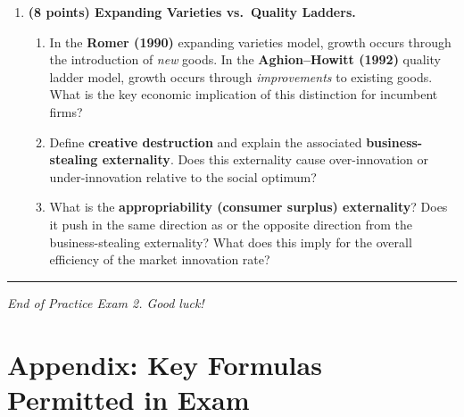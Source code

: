 \documentclass[a4paper,11pt]{article}
\begin{document}
\begin{enumerate}[label=\textbf{\arabic*.}, leftmargin=*, itemsep=14pt]
\begin{enumerate}[label=(\alph*), itemsep=6pt]
        \item This markup creates a static distortion: intermediate goods are
        \emph{under-used} relative to the social optimum.  What policy instrument can
        correct this, and how should it be set?
    \end{enumerate}

    \item \textbf{(8 points) Expanding Varieties vs.\ Quality Ladders.}

    \begin{enumerate}[label=(\alph*), itemsep=6pt]
        \item In the \textbf{Romer (1990)} expanding varieties model, growth occurs
        through the introduction of \emph{new} goods.  In the \textbf{Aghion--Howitt
        (1992)} quality ladder model, growth occurs through \emph{improvements} to
        existing goods.  What is the key economic implication of this distinction for
        incumbent firms?

        \item Define \textbf{creative destruction} and explain the associated
        \textbf{business-stealing externality}.  Does this externality cause
        over-innovation or under-innovation relative to the social optimum?

        \item What is the \textbf{appropriability (consumer surplus) externality}?
        Does it push in the same direction as or the opposite direction from the
        business-stealing externality?  What does this imply for the overall efficiency
        of the market innovation rate?
    \end{enumerate}

\end{enumerate}

\vspace{20pt}
\noindent\rule{\textwidth}{0.4pt}

\begin{center}
    \textit{End of Practice Exam 2. Good luck!}
\end{center}

\clearpage
\appendix
\section*{Appendix: Key Formulas Permitted in Exam}
\end{document}
